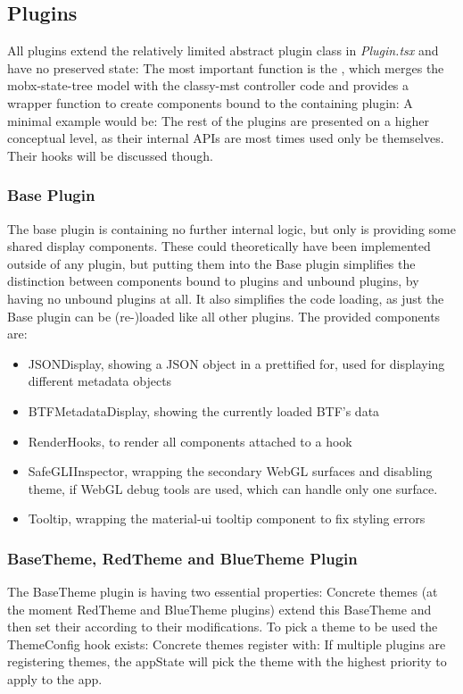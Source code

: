 \subsection{Plugins}\label{sec_plugins}
All plugins extend the relatively limited abstract plugin class in
\emph{Plugin.tsx} and have no preserved state:
The most important function is the , which merges the
mobx-state-tree model with the classy-mst controller code and provides a wrapper
function to create components bound to the containing plugin:
A minimal example would be:
The rest of the plugins are presented on a higher conceptual level, as their
internal APIs are most times used only be themselves. Their hooks will be
discussed though.

\subsubsection{Base Plugin}
The base plugin is containing no further internal logic, but only is providing
some shared display components. These could theoretically have been implemented
outside of any plugin, but putting them into the Base plugin simplifies the
distinction between components bound to plugins and unbound plugins, by having
no unbound plugins at all. It also simplifies the code loading, as just the Base
plugin can be (re-)loaded like all other plugins. The provided components are:
\begin{itemize}
\item JSONDisplay, showing a JSON object in a prettified for, used for
  displaying different metadata objects
\item BTFMetadataDisplay, showing the currently loaded BTF's data
\item RenderHooks, to render all components attached to a hook
\item SafeGLIInspector, wrapping the secondary WebGL surfaces and disabling
    theme, if WebGL debug tools are used, which can handle only one surface.
\item Tooltip, wrapping the material-ui tooltip component to fix styling errors
\end{itemize}

\subsubsection{BaseTheme, RedTheme and BlueTheme Plugin}
The BaseTheme plugin is having two essential properties:
Concrete themes (at the moment RedTheme and BlueTheme plugins) extend this
BaseTheme and then set their  according to their
modifications. To pick a theme to be used the ThemeConfig hook exists:
Concrete themes register with:
If multiple plugins are registering themes, the appState will pick the theme
with the highest priority to apply to the app.

